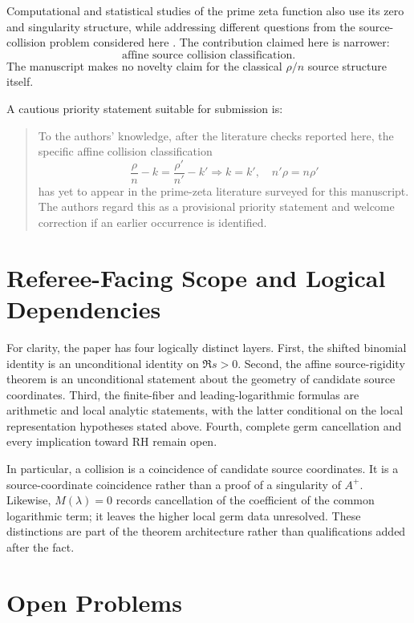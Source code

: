 \documentclass[11pt]{article}
\theoremstyle{definition}
\begin{document}
Computational and statistical studies of the prime zeta function also use its zero and singularity structure, while addressing different questions from the source-collision problem considered here \cite{ChavezAllawala}. The contribution claimed here is narrower:
\[
\boxed{
\text{affine source collision classification}.
}
\]
The manuscript makes no novelty claim for the classical $\rho/n$ source structure itself.

A cautious priority statement suitable for submission is:

\begin{quote}
To the authors' knowledge, after the literature checks reported here, the specific affine collision classification
\[
\frac{\rho}{n}-k=\frac{\rho'}{n'}-k'
\Longrightarrow
k=k',\quad n'\rho=n\rho'
\]
has yet to appear in the prime-zeta literature surveyed for this manuscript. The authors regard this as a provisional priority statement and welcome correction if an earlier occurrence is identified.
\end{quote}


\section{Referee-Facing Scope and Logical Dependencies}

For clarity, the paper has four logically distinct layers. First, the shifted
binomial identity is an unconditional identity on $\Re s>0$. Second, the
affine source-rigidity theorem is an unconditional statement about the
geometry of candidate source coordinates. Third, the finite-fiber and
leading-logarithmic formulas are arithmetic and local analytic statements,
with the latter conditional on the local representation hypotheses stated
above. Fourth, complete germ cancellation and every implication toward RH
remain open.

In particular, a collision is a coincidence of candidate source coordinates.
It is a source-coordinate coincidence rather than a proof of a singularity of $A^+$. Likewise, $M(\lambda)=0$
records cancellation of the coefficient of the common logarithmic term; it
leaves the higher local germ data unresolved. These distinctions are part of
the theorem architecture rather than qualifications added after the fact.

\section{Open Problems}
\end{document}
